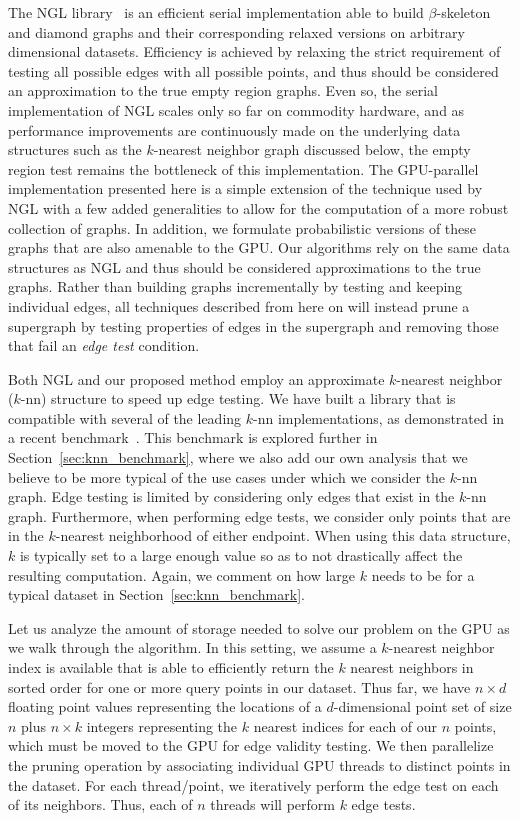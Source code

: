 The NGL library~\cite{CorreaLindstrom2011} is an efficient serial implementation able to build $\beta$-skeleton and diamond graphs and their corresponding relaxed versions on arbitrary dimensional datasets.
%
Efficiency is achieved by relaxing the strict requirement of testing all possible edges with all possible points, and thus should be considered an approximation to the true empty region graphs.
%
Even so, the serial implementation of NGL scales only so far on commodity hardware, and as performance improvements are continuously made on the underlying data structures such as the $k$-nearest neighbor graph discussed below, the empty region test remains the bottleneck of this implementation.
%
The GPU-parallel implementation presented here is a simple extension of the technique used by NGL with a few added generalities to allow for the computation of a more robust collection of graphs.
%
In addition, we formulate probabilistic versions of these graphs that are also amenable to the GPU.
%
Our algorithms rely on the same data structures as NGL and thus should be considered approximations to the true graphs.
%
Rather than building graphs incrementally by testing and keeping individual edges, all techniques described from here on will instead prune a supergraph by testing properties of edges in the supergraph and removing those that fail an \emph{edge test} condition.

Both NGL and our proposed method employ an approximate $k$-nearest neighbor ($k$-nn) structure to speed up edge testing.
%
We have built a library that is compatible with several of the leading $k$-nn implementations, as demonstrated in a recent benchmark~\cite{AumullerBernhardssonFaithfull2017}.
%
This benchmark is explored further in Section~\ref{sec:knn_benchmark}, where we also add our own analysis that we believe to be more typical of the use cases under which we consider the $k$-nn graph.
%
Edge testing is limited by considering only edges that exist in the $k$-nn graph.
%
Furthermore, when performing edge tests, we consider only points that are in the $k$-nearest neighborhood of either endpoint.
%
When using this data structure, $k$ is typically set to a large enough value so as to not drastically affect the resulting computation.
%
Again, we comment on how large $k$ needs to be for a typical dataset in Section~\ref{sec:knn_benchmark}.

Let us analyze the amount of storage needed to solve our problem on the GPU as we walk through the algorithm.
%
In this setting, we assume a $k$-nearest neighbor index is available that is able to efficiently return the $k$ nearest neighbors in sorted order for one or more query points in our dataset.
%
Thus far, we have $n \times d$ floating point values representing the locations of a $d$-dimensional point set of size $n$ plus $n \times k$ integers representing the $k$ nearest indices for each of our $n$ points, which must be moved to the GPU for edge validity testing.
%
We then parallelize the pruning operation by associating individual GPU threads to distinct points in the dataset.
%
For each thread/point, we iteratively perform the edge test on each of its neighbors.
%
Thus, each of $n$ threads will perform $k$ edge tests.

